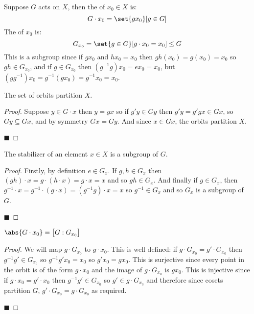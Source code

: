 \documentclass[10pt]{article}
\begin{document}
\begin{defn*}

    Suppose $G$ acts on $X$, then the  of $x_0\in X$ is:
    \[ G\cdot x_0=\set{gx_0}[g\in G] \]
    The  of $x_0$ is:
    \[ G_{x_0} = \set{g\in G}[g\cdot x_0=x_0] \leq G \]
    This is a subgroup since if $gx_0$ and $hx_0=x_0$ then $gh(x_0)=g(x_0)=x_0$ so $gh\in G_{x_0}$, and if $g\in G_{x_0}$ then $(g^{-1}g)x_0=ex_0=x_0$, but $(gg^{-1})x_0=g^{-1}(gx_0)=g^{-1}x_0=x_0$.

\end{defn*}

\begin{prop*}

    The set of orbits partition $X$.

\end{prop*}

\begin{proof}

    Suppose $y\in G\cdot x$ then $y=gx$ so if $g'y\in Gy$ then $g'y=g'gx\in Gx$, so $Gy\subseteq Gx$, and by symmetry $Gx=Gy$.
    And since $x\in Gx$, the orbits partition $X$.

    \hfill$\blacksquare$

\end{proof}

\begin{prop*}

    The stabilizer of an element $x\in X$ is a subgroup of $G$.

\end{prop*}

\begin{proof}

    Firstly, by definition $e\in G_x$.
    If $g,h\in G_x$ then $(gh)\cdot x=g\cdot(h\cdot x)=g\cdot x=x$ and so $gh\in G_x$.
    And finally if $g\in G_x$, then $g^{-1}\cdot x=g^{-1}\cdot(g\cdot x)=(g^{-1}g)\cdot x=x$ so $g^{-1}\in G_x$ and so $G_x$ is a subgroup of $G$.

    \hfill$\blacksquare$

\end{proof}

\begin{prop*}

    $\abs{G\cdot x_0}=\bigl[G:G_{x_0}\bigr]$

\end{prop*}

\begin{proof}

    We will map $g\cdot G_{x_0}$ to $g\cdot x_0$.
    This is well defined: if $g\cdot G_{x_0}=g'\cdot G_{x_0}$ then $g^{-1}g'\in G_{x_0}$ so $g^{-1}g'x_0=x_0$ so $g'x_0=gx_0$.
    This is surjective since every point in the orbit is of the form $g\cdot x_0$ and the image of $g\cdot G_{x_0}$ is $gx_0$.
    This is injective since if $g\cdot x_0=g'\cdot x_0$ then $g^{-1}g'\in G_{x_0}$ so $g'\in g\cdot G_{x_0}$ and therefore since cosets partition $G$, $g'\cdot G_{x_0}=g\cdot G_{x_0}$ as required.

    \hfill$\blacksquare$

\end{proof}
\end{document}
